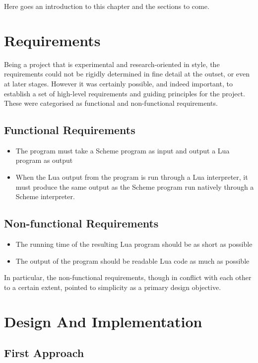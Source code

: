 Here goes an introduction to this chapter and the sections to come.


\section{Requirements}

Being a project that is experimental and research-oriented in style, the
requirements could not be rigidly determined in fine detail at the outset, or
even at later stages. However it was certainly possible, and indeed important,
to establish a set of high-level requirements and guiding principles for the
project. These were categorised as functional and non-functional requirements.

\subsection{Functional Requirements}

\begin{itemize}
\item The program must take a Scheme program as input and output a Lua program
as output
\item When the Lua output from the program is run through a Lua interpreter, it
must produce the same output as the Scheme program run natively through a Scheme
interpreter.
\end{itemize}

\subsection{Non-functional Requirements}

\begin{itemize}
\item The running time of the resulting Lua program should be as short as
possible
\item The output of the program should be readable Lua code as much as possible
\end{itemize}

In particular, the non-functional requirements, though in conflict with each
other to a certain extent, pointed to simplicity as a primary design objective.


\section{Design And Implementation}

\subsection{First Approach}

